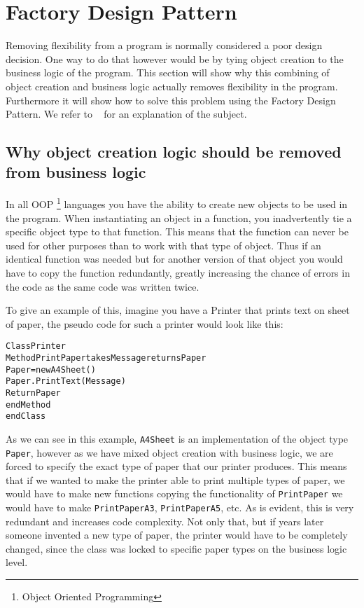 
\section{Factory Design Pattern}

Removing flexibility from a program is normally considered a poor
design decision. One way to do that however would be by tying object
creation to the business logic of the program. This section will show
why this combining of object creation and business logic actually
removes flexibility in the program. Furthermore it will show how to
solve this problem using the Factory Design Pattern. We refer to ~\cite{WikiFactory}
for an explanation of the subject.


\subsection*{Why object creation logic should be removed from business logic}

In all OOP%
\footnote{Object Oriented Programming%
} languages you have the ability to create new objects to be used in
the program. When instantiating an object in a function, you inadvertently
tie a specific object type to that function. This means that the function
can never be used for other purposes than to work with that type of
object. Thus if an identical function was needed but for another version
of that object you would have to copy the function redundantly, greatly
increasing the chance of errors in the code as the same code was written
twice.

To give an example of this, imagine you have a Printer that prints
text on sheet of paper, the pseudo code for such a printer would look
like this:

\begin{alltt}
Class Printer 
    Method PrintPaper takes Message returns Paper
        Paper = new A4Sheet() 		
        Paper.PrintText(Message) 		
        Return Paper 	
    endMethod 
endClass
\end{alltt}

As we can see in this example, \texttt{A4Sheet} is an implementation
of the object type \texttt{Paper}, however as we have mixed object
creation with business logic, we are forced to specify the exact type
of paper that our printer produces. This means that if we wanted to
make the printer able to print multiple types of paper, we would have
to make new functions copying the functionality of \texttt{PrintPaper}
we would have to make \texttt{PrintPaperA3}, \texttt{PrintPaperA5},
etc. As is evident, this is very redundant and increases code complexity.
Not only that, but if years later someone invented a new type of paper,
the printer would have to be completely changed, since the class was
locked to specific paper types on the business logic level. 


